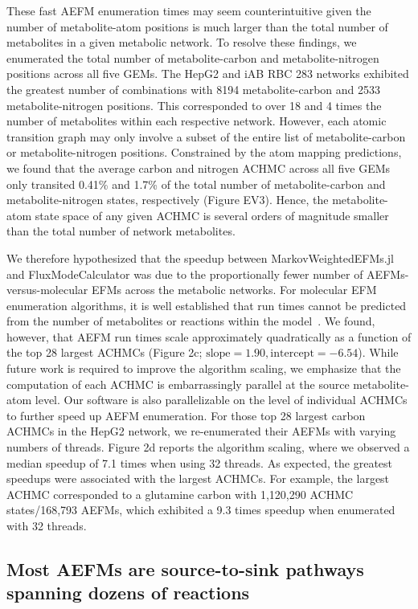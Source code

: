 \documentclass[12pt]{article}
\begin{document}
These fast AEFM enumeration times may seem counterintuitive given the
number of metabolite-atom positions is much larger than the total number
of metabolites in a given metabolic network. To resolve these findings, we
enumerated the total number of metabolite-carbon and metabolite-nitrogen
positions across all five GEMs. The HepG2 and iAB RBC 283 networks
exhibited the greatest number of combinations with 8194 metabolite-carbon
and 2533 metabolite-nitrogen positions. This corresponded to over 18 and
4 times the number of metabolites within each respective network. However,
  each atomic transition graph may only involve a subset of the entire
  list of metabolite-carbon or metabolite-nitrogen positions. Constrained
  by the atom mapping predictions, we found that the average carbon and
  nitrogen ACHMC across all five GEMs only transited 0.41\% and
1.7\% of the total number of metabolite-carbon and metabolite-nitrogen
states, respectively (Figure EV3). Hence, the metabolite-atom state space
of any given ACHMC is several orders of magnitude smaller than the total
number of network metabolites.

We therefore hypothesized that the speedup between MarkovWeightedEFMs.jl
and FluxModeCalculator was due to the proportionally fewer number of
AEFMs-versus-molecular EFMs across the metabolic networks. For molecular
EFM enumeration algorithms, it is well established that run times cannot
be predicted from the number of metabolites or reactions within the
model~\citep{UllahEhsan2020Tsef}. We found, however, that AEFM run times
scale approximately quadratically as a function of the top 28 largest
ACHMCs (Figure 2c; $\text{slope}=1.90, \text{intercept}=-6.54$). While
future work is required to improve the algorithm scaling, we emphasize
that the computation of each ACHMC is embarrassingly parallel at the
source metabolite-atom level. Our software is also parallelizable on the
level of individual ACHMCs to further speed up AEFM enumeration. For those
top 28 largest carbon ACHMCs in the HepG2 network, we re-enumerated their
AEFMs with varying numbers of threads. Figure 2d reports the algorithm
scaling, where we observed a median speedup of 7.1 times when using 32
threads. As expected, the greatest speedups were associated with the
largest ACHMCs. For example, the largest ACHMC corresponded to a glutamine
carbon with 1,120,290 ACHMC states/168,793 AEFMs, which exhibited a 9.3
times speedup when enumerated with 32 threads.

\subsection*{Most AEFMs are source-to-sink pathways spanning dozens of reactions}
\end{document}
